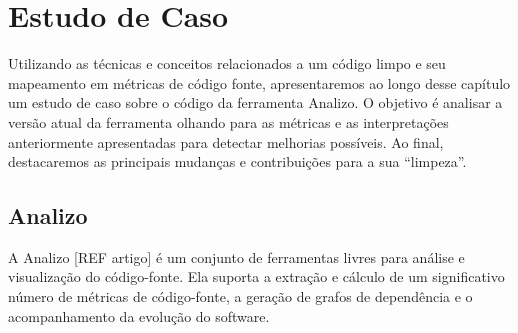 \chapter{Estudo de Caso}
\label{chap:estudodecaso}


Utilizando as técnicas e conceitos relacionados a um código limpo e seu mapeamento em métricas de código fonte, apresentaremos ao longo desse capítulo um 
estudo de caso sobre o código da ferramenta Analizo. O objetivo é analisar a versão atual da ferramenta olhando para as métricas e as interpretações anteriormente apresentadas para detectar melhorias possíveis. Ao final, destacaremos as principais mudanças e contribuições para a sua ``limpeza''.


\section{Analizo}
A Analizo [REF artigo] é um conjunto de ferramentas livres para análise e visualização do código-fonte. Ela suporta a extração e cálculo de um 
significativo número de métricas de código-fonte, a geração de grafos de dependência e o acompanhamento da evolução do software.